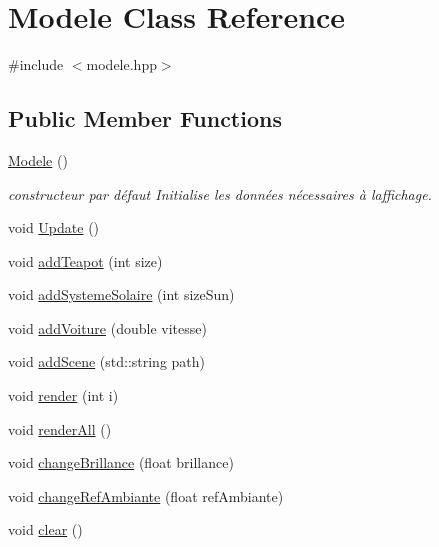 \hypertarget{class_modele}{}\section{Modele Class Reference}
\label{class_modele}


{\ttfamily \#include $<$modele.\+hpp$>$}

\subsection*{Public Member Functions}
\begin{DoxyCompactItemize}
\item 
\hyperlink{class_modele_ae9d6a289deaebe7e8eeda46693d79d23}{Modele} ()
\begin{DoxyCompactList}\small\item\em constructeur par défaut Initialise les données nécessaires à l\textquotesingle{}affichage. \end{DoxyCompactList}\item 
void \hyperlink{class_modele_a4e09a90f4eac78fa17d362fe4ff23b2f}{Update} ()
\item 
void \hyperlink{class_modele_a3a5fdb6f258abb35347ba0610eef5ff2}{add\+Teapot} (int size)
\item 
void \hyperlink{class_modele_a01924068a9a20616cdfe667caaa0e0e5}{add\+Systeme\+Solaire} (int size\+Sun)
\item 
void \hyperlink{class_modele_a9f572a21d86fa69563b9020ddcf7eef9}{add\+Voiture} (double vitesse)
\item 
void \hyperlink{class_modele_a2b9ce0869e6965e9247eaa91587d37b7}{add\+Scene} (std\+::string path)
\item 
void \hyperlink{class_modele_a8c611c3edf341892ceefebd9c3e00136}{render} (int i)
\item 
void \hyperlink{class_modele_a78714b95cdb2f63e76c9e122f41e6bbd}{render\+All} ()
\item 
void \hyperlink{class_modele_af105ed94c8a03a7283b4099ef1855976}{change\+Brillance} (float brillance)
\item 
void \hyperlink{class_modele_ab313a52585ff0db49e253b55ddbbc108}{change\+Ref\+Ambiante} (float ref\+Ambiante)
\item 
void \hyperlink{class_modele_a1f02ee40382488479be64890e53ea348}{clear} ()
\end{DoxyCompactItemize}
